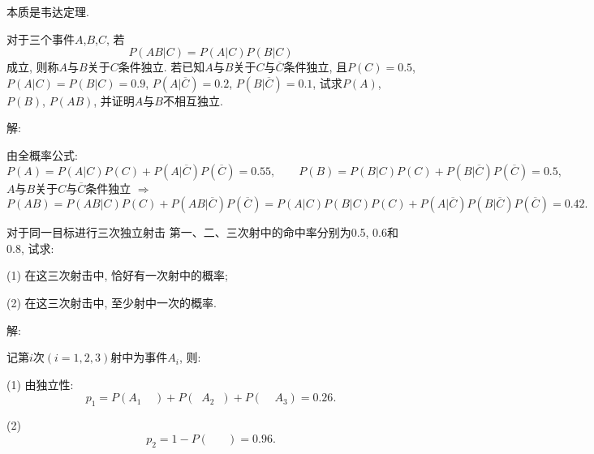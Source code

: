 \documentclass[standard]{ExBook}
\begin{document}
\begin{qitems}
\begin{bbox}
\textcolor{themeColor}{\selectfont {} 本质是韦达定理.}
    \end{bbox}

\vspace{-5em}

    \begin{bbox}
    \begin{shaded}
        \qitem
对于三个事件$A$,$B$,$C$, 若
$$P(AB|C)=P(A|C)P(B|C)$$
成立, 则称$A$与$B$关于$C$条件独立. 若已知$A$与$B$关于$C$与$\overline{C}$条件独立, 且$P(C)=0.5$, $P(A|C)=P(B|C)=0.9$, $P(A|\overline{C})=0.2$, $P(B|\overline{C})=0.1$, 试求$P(A)$, $P(B)$, $P(AB)$, 并证明$A$与$B$不相互独立.
    \end{shaded}
    \end{bbox}

\vspace{-5em}

    \begin{bbox}
解:

由全概率公式:
$$P(A)=P(A|C)P(C)+P(A|\overline{C})P(\overline{C})=0.55,\qquad P(B)=P(B|C)P(C)+P(B|\overline{C})P(\overline{C})=0.5,$$
$A$与$B$关于$C$与$\overline{C}$条件独立 $\Longrightarrow$
$$P(AB)=P(AB|C)P(C)+P(AB|\overline{C})P(\overline{C})=P(A|C)P(B|C)P(C)+P(A|\overline{C})P(B|\overline{C})P(\overline{C})=0.42.$$
    \end{bbox}

\vspace{-5em}

    \begin{bbox}
    \begin{shaded}
        \qitem
对于同一目标进行三次独立射击 第一、二、三次射中的命中率分别为0.5, 0.6和0.8, 试求:

(1) 在这三次射击中, 恰好有一次射中的概率;

(2) 在这三次射击中, 至少射中一次的概率.
    \end{shaded}
    \end{bbox}

\vspace{-5em}

    \begin{bbox}
解:

记第$i$次$(i=1,2,3)$射中为事件$A_{i}$, 则:

(1) 由独立性:
$$p_{1}=P(A_{1}\mathop{\overline{A_{2}}}\mathop{\overline{A_{3}}})+P(\mathop{\overline{A_{1}}}A_{2}\mathop{\overline{A_{3}}})+P(\mathop{\overline{A_{1}}}\mathop{\overline{A_{2}}}A_{3})=0.26.$$

(2) $$p_{2}=1-P(\mathop{\overline{A_{1}}}\mathop{\overline{A_{2}}}\mathop{\overline{A_{3}}})=0.96.$$
    \end{bbox}


\end{qitems}
\end{document}
